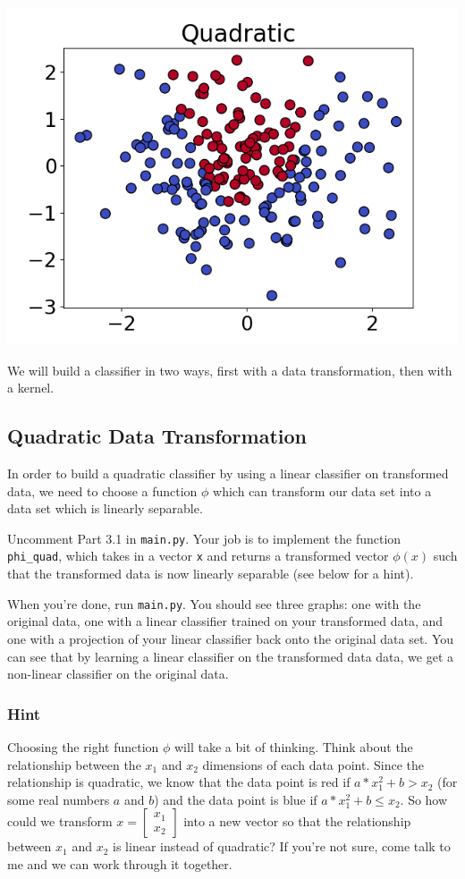 \documentclass{article}
\begin{document}
\noindent
\includegraphics[width=\textwidth]{quadratic.png}

We will build a classifier in two ways, first with a data transformation, then with a kernel.

\subsection{Quadratic Data Transformation}

In order to build a quadratic classifier by using a linear classifier on transformed data, we need to choose a function $\phi$ which can transform our data set into a data set which is linearly separable.

Uncomment Part 3.1 in \texttt{main.py}. Your job is to implement the function \texttt{phi\_quad}, which takes in a vector \texttt{x} and returns a transformed vector $\phi(x)$ such that the transformed data is now linearly separable (see below for a hint).

When you're done, run \texttt{main.py}. You should see three graphs: one with the original data, one with a linear classifier trained on your transformed data, and one with a projection of your linear classifier back onto the original data set. You can see that by learning a linear classifier on the transformed data data, we get a non-linear classifier on the original data.

\subsubsection{Hint}

Choosing the right function $\phi$ will take a bit of thinking. Think about the relationship between the $x_1$ and $x_2$ dimensions of each data point. Since the relationship is quadratic, we know that the data point is red if $a * x_1^2 + b > x_2$ (for some real numbers $a$ and $b$) and the data point is blue if $a * x_1^2 + b \leq x_2$. So how could we transform $x =
\begin{bmatrix}
    x_1 \\
    x_2
\end{bmatrix}$ into a new vector so that the relationship between $x_1$ and $x_2$ is linear instead of quadratic? If you're not sure, come talk to me and we can work through it together.
\end{document}
